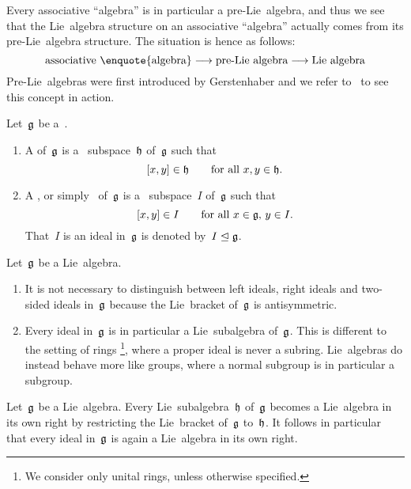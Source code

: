 \begin{remark}
  Every associative \enquote{algebra} is in particular a pre-Lie~algebra, and thus we see that the Lie~algebra structure on an associative \enquote{algebra} actually comes from its pre-Lie~algebra structure.
  The situation is hence as follows:
  \[
    \text{associative \enquote{algebra}}
    \to
    \text{pre-Lie~algebra}
    \to
    \text{Lie~algebra}
  \]
 Pre-Lie~algebras were first introduced by Gerstenhaber and we refer to~\cite{gerstenhaber} to see this concept in action.
\end{remark}


\begin{definition}
  Let~$\mathfrak{g}$ be a~{\liealgebra{$\kf$}}.
  \begin{enumerate}
    \item
      A  of~$\mathfrak{g}$ is a~{\linear{$\kf$}} subspace~$\mathfrak{h}$ of~$\mathfrak{g}$ such that
      \[
        [x,y] \in \mathfrak{h}
        \qquad
        \text{for all~$x, y \in \mathfrak{h}$.}
      \]
    \item
      A , or simply~ of~$\mathfrak{g}$ is a~{\linear{$\kf$}} subspace~$I$ of~$\mathfrak{g}$ such that
      \[
        [x,y] \in I
        \qquad
        \text{for all~$x \in \mathfrak{g}$,~$y \in I$.}
      \]
      That~$I$ is an ideal in~$\mathfrak{g}$ is denoted by~$I \trianglelefteq \mathfrak{g}$.
  \end{enumerate}
\end{definition}


\begin{remark}
  \label{on the notion of ideals}
  Let~$\mathfrak{g}$ be a Lie~algebra.
  \begin{enumerate}
    \item
      It is not necessary to distinguish between left ideals, right ideals and two-sided ideals in~$\mathfrak{g}$ because the Lie~bracket of~$\mathfrak{g}$ is antisymmetric.
    \item
      Every ideal in~$\mathfrak{g}$ is in particular a Lie~subalgebra of~$\mathfrak{g}$.
      This is different to the setting of rings%
      \footnote{
        We consider only unital rings, unless otherwise specified.
      }, where a proper ideal is never a subring.
      Lie~algebras do instead behave more like groups, where a normal subgroup is in particular a subgroup.
  \end{enumerate}
\end{remark}


\begin{remark}
  Let~$\mathfrak{g}$ be a Lie~algebra.
  Every Lie~subalgebra~$\mathfrak{h}$ of~$\mathfrak{g}$ becomes a Lie~algebra in its own right by restricting the Lie~bracket of~$\mathfrak{g}$ to~$\mathfrak{h}$.
  It follows in particular that every ideal in~$\mathfrak{g}$ is again a Lie~algebra in its own right.
\end{remark}


